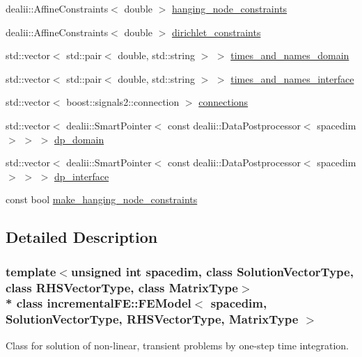 \begin{DoxyCompactItemize}
\item 
dealii\+::\+Affine\+Constraints$<$ double $>$ \hyperlink{classincremental_f_e_1_1_f_e_model_af333d1d12e78c27c74b033a85d075d38}{hanging\+\_\+node\+\_\+constraints}
\item 
dealii\+::\+Affine\+Constraints$<$ double $>$ \hyperlink{classincremental_f_e_1_1_f_e_model_a4ea39622157334a3d985c418a3b9ca34}{dirichlet\+\_\+constraints}
\item 
std\+::vector$<$ std\+::pair$<$ double, std\+::string $>$ $>$ \hyperlink{classincremental_f_e_1_1_f_e_model_a9a6cc0723bdeb129e330179ed4a87670}{times\+\_\+and\+\_\+names\+\_\+domain}
\item 
std\+::vector$<$ std\+::pair$<$ double, std\+::string $>$ $>$ \hyperlink{classincremental_f_e_1_1_f_e_model_aaa0e0ef1be909224dfe6f28484b9d754}{times\+\_\+and\+\_\+names\+\_\+interface}
\item 
std\+::vector$<$ boost\+::signals2\+::connection $>$ \hyperlink{classincremental_f_e_1_1_f_e_model_acf28a249a6d3800401624fc8bc8f3baf}{connections}
\item 
std\+::vector$<$ dealii\+::\+Smart\+Pointer$<$ const dealii\+::\+Data\+Postprocessor$<$ spacedim $>$ $>$ $>$ \hyperlink{classincremental_f_e_1_1_f_e_model_aff2f85b08282289389284138ca708eca}{dp\+\_\+domain}
\item 
std\+::vector$<$ dealii\+::\+Smart\+Pointer$<$ const dealii\+::\+Data\+Postprocessor$<$ spacedim $>$ $>$ $>$ \hyperlink{classincremental_f_e_1_1_f_e_model_adeb548ba39fe59036312bb8ba1d8cbf9}{dp\+\_\+interface}
\item 
const bool \hyperlink{classincremental_f_e_1_1_f_e_model_a65b5910cfba2feb26933ad451ceff628}{make\+\_\+hanging\+\_\+node\+\_\+constraints}
\end{DoxyCompactItemize}


\subsection{Detailed Description}
\subsubsection*{template$<$unsigned int spacedim, class Solution\+Vector\+Type, class R\+H\+S\+Vector\+Type, class Matrix\+Type$>$\\*
class incremental\+F\+E\+::\+F\+E\+Model$<$ spacedim, Solution\+Vector\+Type, R\+H\+S\+Vector\+Type, Matrix\+Type $>$}

Class for solution of non-\/linear, transient problems by one-\/step time integration.

